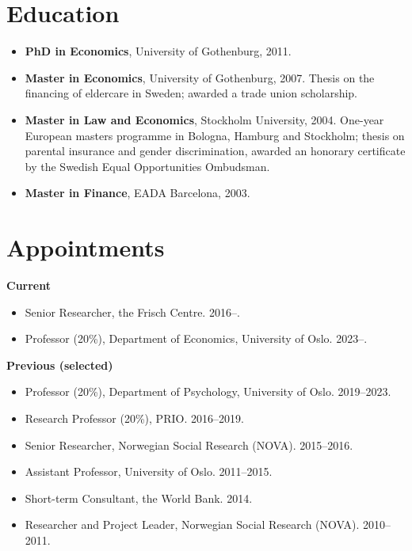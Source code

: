 \documentclass[11pt]{article}
\begin{document}
\section{Education}
\begin{itemize}
  \item \textbf{PhD in Economics}, University of Gothenburg, 2011.
  \item \textbf{Master in Economics}, University of Gothenburg, 2007. Thesis on the financing of eldercare in Sweden; awarded a trade union scholarship.
  \item \textbf{Master in Law and Economics}, Stockholm University, 2004. One-year European masters programme in Bologna, Hamburg and Stockholm; thesis on parental insurance and gender discrimination, awarded an honorary certificate by the Swedish Equal Opportunities Ombudsman.
  \item \textbf{Master in Finance}, EADA Barcelona, 2003.
\end{itemize}

\section{Appointments}
\textbf{Current}
\begin{itemize}
  \item Senior Researcher, the Frisch Centre. 2016--.
  \item Professor (20\%), Department of Economics, University of Oslo. 2023--.
\end{itemize}
\vspace{0.3em}
\textbf{Previous (selected)}
\begin{itemize}
  \item Professor (20\%), Department of Psychology, University of Oslo. 2019--2023.
  \item Research Professor (20\%), PRIO. 2016--2019.
  \item Senior Researcher, Norwegian Social Research (NOVA). 2015--2016.
  \item Assistant Professor, University of Oslo. 2011--2015.
  \item Short-term Consultant, the World Bank. 2014.
  \item Researcher and Project Leader, Norwegian Social Research (NOVA). 2010--2011.
\end{itemize}

\end{document}
